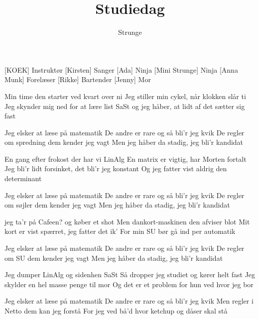 \documentclass[a4paper,11pt]{article}
\title{Studiedag}
\author{Strunge}
\begin{document}
\maketitle

\begin{roles}
[KOEK] Instruktør
[Kirsten] Sanger
[Ada] Ninja
[Mini Strunge] Ninja
[Anna Munk] Forelæser
[Rikke] Bartender
[Jenny] Mor
\end{roles}
\begin{song}
 Min time den starter ved kvart over ni
Jeg stiller min cykel, når klokken slår ti
Jeg skynder mig ned for at lære list SaSt
og jeg håber, at lidt af det sætter sig fast

Jeg elsker at læse på matematik 
De andre er rare og så bli'r jeg kvik
De regler om spredning dem kender jeg vagt
Men jeg håber da stadig, jeg bli'r kandidat

En gang efter frokost der har vi LinAlg
En matrix er vigtig, har Morten fortalt
Jeg bli'r lidt forsinket, det bli'r jeg konstant
Og jeg fatter vist aldrig den determinant

Jeg elsker at læse på matematik 
De andre er rare og så bli'r jeg kvik
De regler om søjler dem kender jeg vagt
Men jeg håber da stadig, jeg bli'r kandidat

jeg ta'r på Cafeen? og køber et shot
Men dankort-maskinen den afviser blot
Mit kort er vist spærret, jeg fatter det ik'
For min SU bør gå ind per automatik

Jeg elsker at læse på matematik 
De andre er rare og så bli'r jeg kvik
De regler om SU dem kender jeg vagt
Men jeg håber da stadig, jeg bli'r kandidat

Jeg dumper LinAlg og sidenhen SaSt
Så dropper jeg studiet og kører helt fast
Jeg skylder en hel masse penge til mor 
Og det er et problem for hun ved hvor jeg bor

Jeg elsker at læse på matematik 
De andre er rare og så bli'r jeg kvik
Men regler i Netto dem kan jeg forstå
For jeg ved bå'd hvor ketchup og dåser skal stå

\end{song}
\end{document}
